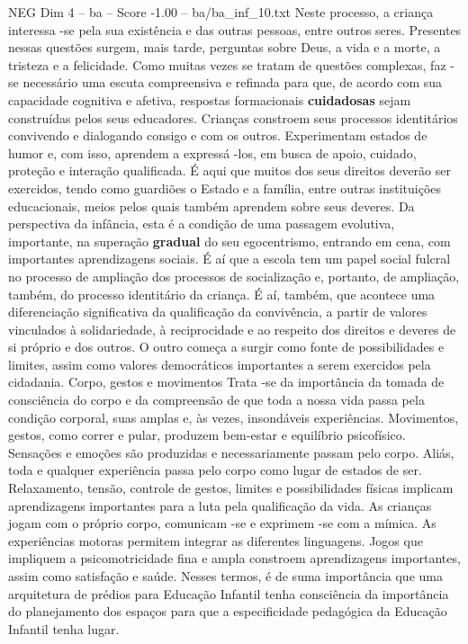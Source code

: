 \begin{textsample}{NEG Dim 4 – ba – Score -1.00 – ba/ba\_inf\_10.txt}
Neste processo, a criança interessa -se pela sua existência e das outras pessoas, entre outros seres.
Presentes nessas questões surgem, mais tarde, perguntas sobre Deus, a vida e a morte, a tristeza e a felicidade.
Como muitas vezes se tratam de questões complexas, faz -se necessário uma escuta compreensiva e refinada para que, de acordo com sua capacidade cognitiva e afetiva, respostas formacionais \textbf{cuidadosas} sejam construídas pelos seus educadores.
Crianças constroem seus processos identitários convivendo e dialogando consigo e com os outros.
Experimentam estados de humor e, com isso, aprendem a expressá -los, em busca de apoio, cuidado, proteção e interação qualificada.
É aqui que muitos dos seus direitos deverão ser exercidos, tendo como guardiões o Estado e a família, entre outras instituições educacionais, meios pelos quais também aprendem sobre seus deveres.
Da perspectiva da infância, esta é a condição de uma passagem evolutiva, importante, na superação \textbf{gradual} do seu egocentrismo, entrando em cena, com importantes aprendizagens sociais.
É aí que a escola tem um papel social fulcral no processo de ampliação dos processos de socialização e, portanto, de ampliação, também, do processo identitário da criança.
É aí, também, que acontece uma diferenciação significativa da qualificação da convivência, a partir de valores vinculados à solidariedade, à reciprocidade e ao respeito dos direitos e deveres de si próprio e dos outros.
O outro começa a surgir como fonte de possibilidades e limites, assim como valores democráticos importantes a serem exercidos pela cidadania.
Corpo, gestos e movimentos Trata -se da importância da tomada de consciência do corpo e da compreensão de que toda a nossa vida passa pela condição corporal, suas amplas e, às vezes, insondáveis experiências.
Movimentos, gestos, como correr e pular, produzem bem-estar e equilíbrio psicofísico.
Sensações e emoções são produzidas e necessariamente passam pelo corpo.
Aliás, toda e qualquer experiência passa pelo corpo como lugar de estados de ser.
Relaxamento, tensão, controle de gestos, limites e possibilidades físicas implicam aprendizagens importantes para a luta pela qualificação da vida.
As crianças jogam com o próprio corpo, comunicam -se e exprimem -se com a mímica.
As experiências motoras permitem integrar as diferentes linguagens.
Jogos que impliquem a psicomotricidade fina e ampla constroem aprendizagens importantes, assim como satisfação e saúde.
Nesses termos, é de suma importância que uma arquitetura de prédios para Educação Infantil tenha consciência da importância do planejamento dos espaços para que a especificidade pedagógica da Educação Infantil tenha lugar.

\end{textsample}
